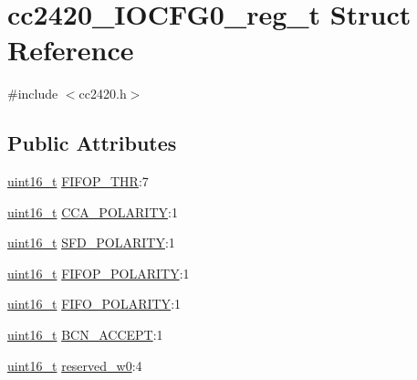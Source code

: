 \hypertarget{structcc2420___i_o_c_f_g0__reg__t}{}\section{cc2420\+\_\+\+I\+O\+C\+F\+G0\+\_\+reg\+\_\+t Struct Reference}
\label{structcc2420___i_o_c_f_g0__reg__t}


{\ttfamily \#include $<$cc2420.\+h$>$}

\subsection*{Public Attributes}
\begin{DoxyCompactItemize}
\item 
\hyperlink{_p_e___types_8h_a1f1825b69244eb3ad2c7165ddc99c956}{uint16\+\_\+t} \hyperlink{structcc2420___i_o_c_f_g0__reg__t_a3d2760b38fedaad03545b7332d31744a}{F\+I\+F\+O\+P\+\_\+\+T\+HR}\+:7
\item 
\hyperlink{_p_e___types_8h_a1f1825b69244eb3ad2c7165ddc99c956}{uint16\+\_\+t} \hyperlink{structcc2420___i_o_c_f_g0__reg__t_a9f86cc684cab24c2acc9b5366ffbe55f}{C\+C\+A\+\_\+\+P\+O\+L\+A\+R\+I\+TY}\+:1
\item 
\hyperlink{_p_e___types_8h_a1f1825b69244eb3ad2c7165ddc99c956}{uint16\+\_\+t} \hyperlink{structcc2420___i_o_c_f_g0__reg__t_a93edbb9864379f04febd71ce3c92d137}{S\+F\+D\+\_\+\+P\+O\+L\+A\+R\+I\+TY}\+:1
\item 
\hyperlink{_p_e___types_8h_a1f1825b69244eb3ad2c7165ddc99c956}{uint16\+\_\+t} \hyperlink{structcc2420___i_o_c_f_g0__reg__t_aaf96ad3db965c4f2e6201323a38bd6c8}{F\+I\+F\+O\+P\+\_\+\+P\+O\+L\+A\+R\+I\+TY}\+:1
\item 
\hyperlink{_p_e___types_8h_a1f1825b69244eb3ad2c7165ddc99c956}{uint16\+\_\+t} \hyperlink{structcc2420___i_o_c_f_g0__reg__t_a4f4fca5c14ee71ecec297f0225ad9023}{F\+I\+F\+O\+\_\+\+P\+O\+L\+A\+R\+I\+TY}\+:1
\item 
\hyperlink{_p_e___types_8h_a1f1825b69244eb3ad2c7165ddc99c956}{uint16\+\_\+t} \hyperlink{structcc2420___i_o_c_f_g0__reg__t_a6bf5ae236912cac7fbc9b57ff0f1c5bb}{B\+C\+N\+\_\+\+A\+C\+C\+E\+PT}\+:1
\item 
\hyperlink{_p_e___types_8h_a1f1825b69244eb3ad2c7165ddc99c956}{uint16\+\_\+t} \hyperlink{structcc2420___i_o_c_f_g0__reg__t_afa9bbbe9ad2f56affcf9e80cb8f1fad9}{reserved\+\_\+w0}\+:4
\end{DoxyCompactItemize}


